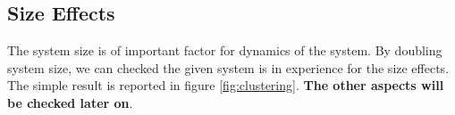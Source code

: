 \message{ !name(brief_Brownian_dynamics.tex)}\documentclass[10pt, a4paper]{report}
\begin{document}
\subsection{Size Effects}
The system size is of important factor for dynamics of the system. By doubling system size, we can checked the given system is in experience for the size effects. The simple result is reported in figure \ref{fig:clustering}. \textbf{The other aspects will be checked later on}.

\end{document}
